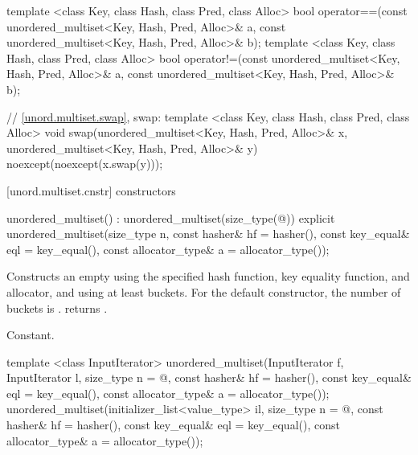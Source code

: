 \begin{codeblock}
{  template <class Key, class Hash, class Pred, class Alloc>
    bool operator==(const unordered_multiset<Key, Hash, Pred, Alloc>& a,
                    const unordered_multiset<Key, Hash, Pred, Alloc>& b);
  template <class Key, class Hash, class Pred, class Alloc>
    bool operator!=(const unordered_multiset<Key, Hash, Pred, Alloc>& a,
                    const unordered_multiset<Key, Hash, Pred, Alloc>& b);

  // \ref{unord.multiset.swap}, swap:
  template <class Key, class Hash, class Pred, class Alloc>
    void swap(unordered_multiset<Key, Hash, Pred, Alloc>& x,
              unordered_multiset<Key, Hash, Pred, Alloc>& y)
      noexcept(noexcept(x.swap(y)));
}
\end{codeblock}

[unord.multiset.cnstr]{ constructors}

%
\begin{itemdecl}
unordered_multiset() : unordered_multiset(size_type(@\seebelow@)) { }
explicit unordered_multiset(size_type n,
                            const hasher& hf = hasher(),
                            const key_equal& eql = key_equal(),
                            const allocator_type& a = allocator_type());
\end{itemdecl}

\begin{itemdescr}
\pnum
\effects Constructs an empty  using the
specified hash function, key equality function, and allocator, and
using at least  buckets.  For the default constructor,
the number of buckets is .
 returns .

\pnum
\complexity Constant.
\end{itemdescr}

%
\begin{itemdecl}
template <class InputIterator>
  unordered_multiset(InputIterator f, InputIterator l,
                     size_type n = @\seebelow@,
                     const hasher& hf = hasher(),
                     const key_equal& eql = key_equal(),
                     const allocator_type& a = allocator_type());
unordered_multiset(initializer_list<value_type> il,
                   size_type n = @\seebelow@,
                   const hasher& hf = hasher(),
                   const key_equal& eql = key_equal(),
                   const allocator_type& a = allocator_type());
\end{itemdecl}

